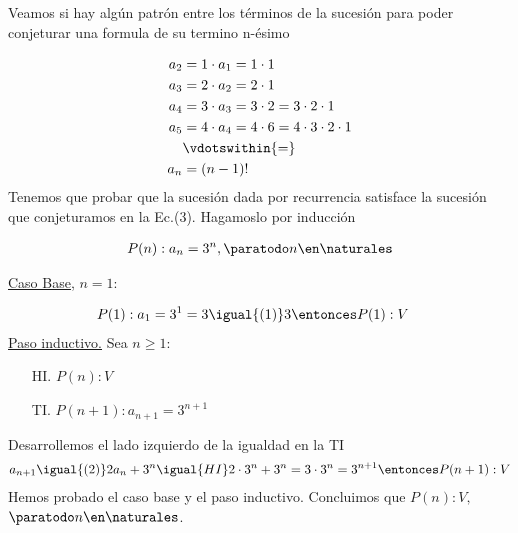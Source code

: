 \begin{enumerate}[label=\roman*)]
        Veamos si hay algún patrón entre los términos de la sucesión para poder conjeturar una formula de su termino
        n-ésimo

        \begin{align}
          a_2 & = 1 \cdot a_1 = 1 \cdot 1 \nonumber                             \\
          a_3 & = 2 \cdot a_2 = 2 \cdot 1 \nonumber                             \\
          a_4 & = 3 \cdot a_3 = 3 \cdot 2 = 3 \cdot 2 \cdot 1 \nonumber         \\
          a_5 & = 4 \cdot a_4 = 4 \cdot 6 = 4 \cdot 3 \cdot 2 \nonumber \cdot 1 \\
              & \vdotswithin{=} \nonumber                                       \\
          a_n & = (n-1)!
        \end{align}
        Tenemos que probar que la sucesión dada por recurrencia satisface la sucesión que conjeturamos en la Ec.(3).
        Hagamoslo por inducción

        \begin{align*}
          P(n): a_n = 3^n, \paratodo n \en \naturales
        \end{align*}

        \underline{Caso Base}, $n = 1$:

        \begin{align*}
           & P(1): a_1 = 3^1 = 3 \igual{(1)} 3 \entonces P(1):V
        \end{align*}
        \underline{Paso inductivo.} Sea $n \geq 1$:
        \begin{enumerate}
          \item[HI.] $P(n): V$
          \item[TI.] $P(n+1): a_{n+1} = 3^{n+1}$
        \end{enumerate}
        Desarrollemos el lado izquierdo de la igualdad en la TI
        \begin{align*}
          a_{n+1} \igual{(2)} 2 a_n + 3^n \igual{HI} 2 \cdot 3^n + 3^n = 3 \cdot 3^n = 3^{n+1}
          \entonces P(n+1):V
        \end{align*}
        Hemos probado el caso base y el paso inductivo. Concluimos que $P(n):V,$ $\paratodo n \en \naturales $.


\end{enumerate}
